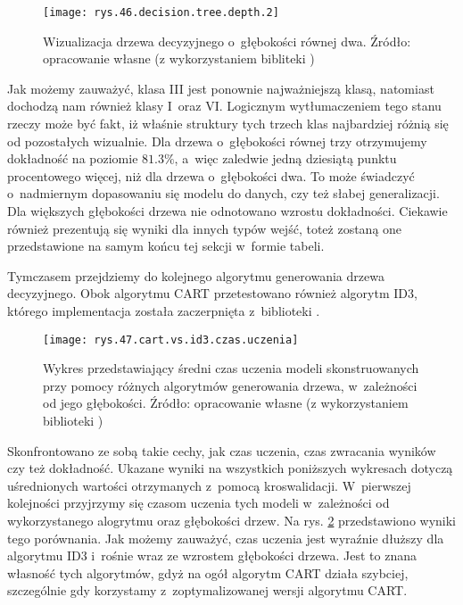 \begin{figure}[h]
    \centering
    \texttt{[image: rys.46.decision.tree.depth.2]}
    \caption{Wizualizacja drzewa decyzyjnego o~głębokości równej dwa. Źródło: opracowanie własne (z wykorzystaniem bibliteki )}
    \label{rys.46.decision.tree.depth.2}
\end{figure}
Jak możemy zauważyć, klasa III jest ponownie najważniejszą klasą, natomiast dochodzą nam również klasy I~oraz VI. Logicznym wytłumaczeniem tego stanu rzeczy może być fakt, iż właśnie struktury tych trzech klas najbardziej różnią się od pozostałych wizualnie. Dla drzewa o~głębokości równej trzy otrzymujemy dokładność na poziomie $81.3\%$, a~więc zaledwie jedną dziesiątą punktu procentowego więcej, niż dla drzewa o~głębokości dwa. To może świadczyć o~nadmiernym dopasowaniu się modelu do danych, czy też słabej generalizacji. Dla większych głębokości drzewa nie odnotowano wzrostu dokładności. Ciekawie również prezentują się wyniki dla innych typów wejść, toteż zostaną one przedstawione na samym końcu tej sekcji w~formie tabeli. 

Tymczasem przejdziemy do kolejnego algorytmu generowania drzewa decyzyjnego. Obok algorytmu CART przetestowano również algorytm ID3, którego implementacja została zaczerpnięta z~biblioteki . 
\begin{figure}[h]
    \centering
    \texttt{[image: rys.47.cart.vs.id3.czas.uczenia]}
    \caption{Wykres przedstawiający średni czas uczenia modeli skonstruowanych przy pomocy różnych algorytmów generowania drzewa, w~zależności od jego głębokości. Źródło: opracowanie własne (z wykorzystaniem biblioteki )}
    \label{rys.47.cart.vs.id3.czas.uczenia}
\end{figure}
Skonfrontowano ze sobą takie cechy, jak czas uczenia, czas zwracania wyników czy też dokładność. Ukazane wyniki na wszystkich poniższych wykresach dotyczą uśrednionych wartości otrzymanych z~pomocą kroswalidacji. W~pierwszej kolejności przyjrzymy się czasom uczenia tych modeli w~zależności od wykorzystanego alogrytmu oraz głębokości drzew. Na rys. \ref{rys.47.cart.vs.id3.czas.uczenia} przedstawiono wyniki tego porównania.
Jak możemy zauważyć, czas uczenia jest wyraźnie dłuższy dla algorytmu ID3 i~rośnie wraz ze wzrostem głębokości drzewa. Jest to znana własność tych algorytmów, gdyż na ogół algorytm CART działa szybciej, szczególnie gdy korzystamy z~zoptymalizowanej wersji algorytmu CART. 


